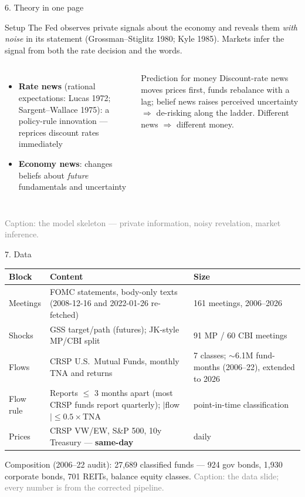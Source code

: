 \documentclass[aspectratio=169, 11pt]{beamer}
\newenvironment{ablock}[1]{\begin{block}{#1}}{\end{block}}
\newenvironment{agreenblock}[1]{\begin{exampleblock}{#1}}{\end{exampleblock}}
\begin{document}
\begin{frame}{6. Theory in one page}
  \begin{ablock}{Setup}
    The Fed observes private signals about the economy and reveals them \emph{with noise} in its statement
    (Grossman--Stiglitz 1980; Kyle 1985). Markets infer the signal from both the rate decision and the words.
  \end{ablock}
  \begin{columns}[T]
    \begin{itemize}
      \item \textbf{Rate news} (rational expectations: Lucas 1972; Sargent--Wallace 1975): a policy-rule innovation
            --- reprices discount rates immediately
      \item \textbf{Economy news}: changes beliefs about \emph{future} fundamentals and uncertainty
    \end{itemize}
    \begin{agreenblock}{Prediction for money}
      Discount-rate news moves prices first, funds rebalance with a lag; belief news raises perceived uncertainty
      $\Rightarrow$ de-risking along the ladder. Different news $\Rightarrow$ different money.
    \end{agreenblock}
  \end{columns}
  {\scriptsize\textcolor{gray}{Caption: the model skeleton --- private information, noisy revelation, market inference.}}
\end{frame}

\begin{frame}{7. Data}
  \footnotesize
  \begin{tabularx}{\textwidth}{l X l}
    \toprule
    \textbf{Block} & \textbf{Content} & \textbf{Size} \\
    \midrule
    Meetings & FOMC statements, body-only texts (2008-12-16 and 2022-01-26 re-fetched) & 161 meetings, 2006--2026 \\
    Shocks & GSS target/path (futures); JK-style MP/CBI split & 91 MP / 60 CBI meetings \\
    Flows & CRSP U.S.\ Mutual Funds, monthly TNA and returns & 7 classes; $\sim$6.1M fund-months (2006--22), extended to 2026 \\
    Flow rule & Reports $\leq$ 3 months apart (most CRSP funds report quarterly); $|$flow$| \leq 0.5\times$TNA & point-in-time classification \\
    Prices & CRSP VW/EW, S\&P 500, 10y Treasury --- \textbf{same-day} & daily \\
    \bottomrule
  \end{tabularx}
  \vspace{0.3em}
  {\scriptsize Composition (2006--22 audit): 27{,}689 classified funds --- 924 gov bonds, 1{,}930 corporate bonds, 701 REITs, balance equity classes.}
  {\scriptsize\textcolor{gray}{Caption: the data slide; every number is from the corrected pipeline.}}
\end{frame}
\end{document}
